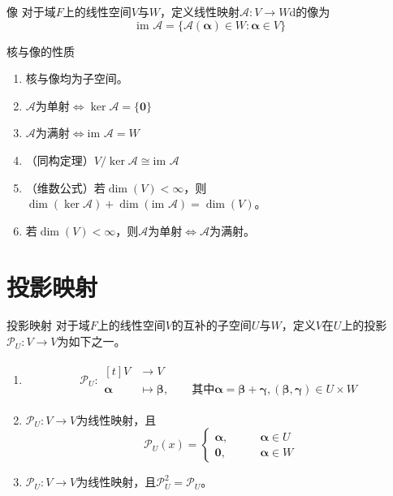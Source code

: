 \documentclass[lang = cn, scheme = chinese, thmcnt = section]{elegantbook}
\newcommand{\im}{\text{im }}           %
\newcommand{\bs}{\boldsymbol}          %
\begin{document}
\begin{definition}{像}
	对于域$F$上的线性空间$V$与$W$，定义线性映射$\mathscr{A}:V\to W$d的像为%
	$$
	\im\mathscr{A}=\{ \mathscr{A}(\bs{\alpha})\in W:\bs{\alpha}\in V \}
	$$
\end{definition}

\begin{proposition}{核与像的性质}
	\begin{enumerate}
		\item 核与像均为子空间。
		\item $\mathscr{A}$为单射$\iff\ker\mathscr{A}=\{ \bs{0} \}$
		\item $\mathscr{A}$为满射$\iff\im\mathscr{A}=W$
		\item （同构定理）$V/\ker\mathscr{A}\cong\im\mathscr{A}$
		\item （维数公式）若$\dim(V)<\infty$，则$\dim(\ker\mathscr{A})+\dim(\im\mathscr{A})=\dim(V)$。
		\item 若$\dim(V)<\infty$，则$\mathscr{A}$为单射$\iff$$\mathscr{A}$为满射。
	\end{enumerate}
\end{proposition}

\section{投影映射}

\begin{definition}{投影映射}
	对于域$F$上的线性空间$V$的互补的子空间$U$与$W$，定义$V$在$U$上的投影$\mathscr{P}_U:V\to V$为如下之一。
	\begin{enumerate}
		\item 
		\begin{align*}
			\mathscr{P}_U:\begin{aligned}[t]
				V &\longrightarrow V\\
				\bs{\alpha} &\longmapsto \bs{\beta},\qquad \text{其中}\bs{\alpha}=\bs{\beta}+\bs{\gamma},(\bs{\beta},\bs{\gamma})\in U\times W
			\end{aligned}
		\end{align*}
		\item $\mathscr{P}_U:V\to V$为线性映射，且%
		$$
		\mathscr{P}_U(x)=\begin{cases}
			\bs{\alpha},\qquad & \bs{\alpha}\in U\\
			\bs{0},\qquad & \bs{\alpha}\in W
		\end{cases}
		$$
		\item $\mathscr{P}_U:V\to V$为线性映射，且$\mathscr{P}_U^2=\mathscr{P}_U$。
	\end{enumerate}
\end{definition}
\end{document}
